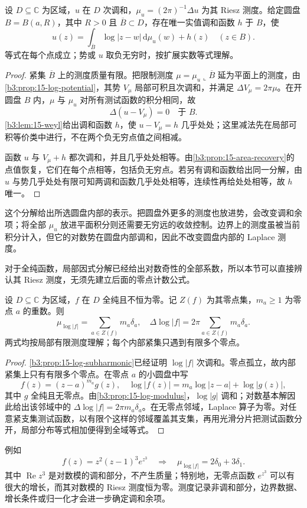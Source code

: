 \begin{theorem}[局部 Riesz 分解]\label{b3:thm:15-riesz-decomposition}
设 \(D\subseteq\mathbb C\) 为区域，\(u\) 在 \(D\) 次调和，\(\mu_u=(2\pi)^{-1}\Delta u\) 为其 Riesz 测度。给定圆盘 \(B=B(a,R)\)，其中 \(R>0\) 且 \(\overline B\subset D\)，存在唯一实值调和函数 \(h\) 于 \(B\)，使
\[
 u(z)=\int_{\overline B}\log|z-w|\,\mathrm{d}\mu_u(w)+h(z)
 \quad(z\in B).
\]
等式在每个点成立；势或 \(u\) 取负无穷时，按扩展实数等式理解。
\end{theorem}
\begin{proof}
紧集 \(\overline B\) 上的测度质量有限。把限制测度 \(\mu=\mu_u\llcorner\overline B\) 延为平面上的测度，由\cref{b3:prop:15-log-potential}，其势 \(V_\mu\) 局部可积且次调和，并满足 \(\Delta V_\mu=2\pi\mu\)。在开圆盘 \(B\) 内，\(\mu\) 与 \(\mu_u\) 对所有测试函数的积分相同，故
\[
 \Delta(u-V_\mu)=0\quad\text{于 }B.
\]
\cref{b3:lem:15-weyl}给出调和函数 \(h\)，使 \(u-V_\mu=h\) 几乎处处；这里减法先在局部可积等价类中进行，不在两个负无穷点值之间相减。

函数 \(u\) 与 \(V_\mu+h\) 都次调和，并且几乎处处相等。由\cref{b3:prop:15-area-recovery}的点值恢复，它们在每个点相等，包括负无穷点。若另有调和函数给出同一分解，由 \(u\) 与势几乎处处有限可知两调和函数几乎处处相等，连续性再给处处相等，故 \(h\) 唯一。
\end{proof}
这个分解给出所选圆盘内部的表示。把圆盘外更多的测度也放进势，会改变调和余项；将全部 \(\mu_u\) 放进平面积分则还需要无穷远的收敛控制。边界上的测度虽被当前积分计入，但它的对数势在圆盘内部调和，因此不改变圆盘内部的 Laplace 测度。

\ProseParagraphBreak

对于全纯函数，局部因式分解已经给出对数奇性的全部系数，所以本节可以直接辨认其 Riesz 测度，无须先建立后面的零点计数公式。

\begin{corollary}[对数模的零点测度]\label{b3:cor:15-zero-measure}
设 \(D\subseteq\mathbb C\) 为区域，\(f\) 在 \(D\) 全纯且不恒为零。记 \(Z(f)\) 为其零点集，\(m_a\ge1\) 为零点 \(a\) 的重数。则
\[
 \mu_{\log|f|}=\sum_{a\in Z(f)}m_a\delta_a,
 \quad
 \Delta\log|f|=2\pi\sum_{a\in Z(f)}m_a\delta_a.
\]
两式均按局部有限测度理解；每个内部紧集只遇到有限多个零点。
\end{corollary}
\begin{proof}
\cref{b3:prop:15-log-subharmonic}已经证明 \(\log|f|\) 次调和。零点孤立，故内部紧集上只有有限多个零点。在零点 \(a\) 的小圆盘中写
\[
 f(z)=(z-a)^{m_a}g(z),
 \quad
 \log|f(z)|=m_a\log|z-a|+\log|g(z)|,
\]
其中 \(g\) 全纯且无零点。由\cref{b3:prop:15-log-modulus}，\(\log|g|\) 调和；对数基本解因此给出该邻域中的 \(\Delta\log|f|=2\pi m_a\delta_a\)。在无零点邻域，Laplace 算子为零。对任意紧支集测试函数，以有限个这样的邻域覆盖其支集，再用光滑分片把测试函数分开，局部分布等式相加便得到全域等式。
\end{proof}
例如
\[
 f(z)=z^2(z-1)^3e^{z^3}
 \quad\Longrightarrow\quad
 \mu_{\log|f|}=2\delta_0+3\delta_1.
\]
其中 \(\operatorname{Re}z^3\) 是对数模的调和部分，不产生质量；特别地，无零点函数 \(e^{z^3}\) 可以有很大的增长，而其对数模的 Riesz 测度恒为零。测度记录非调和部分，边界数据、增长条件或归一化才会进一步确定调和余项。
